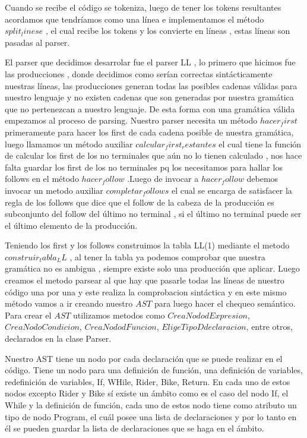 	Cuando se recibe el código se tokeniza, luego de tener los tokens resultantes acordamos que tendríamos como una línea e implementamos el método $split_linese$ , el cual	recibe los tokens y los convierte en líneas , estas líneas son pasadas al parser.
	
	El parser que decidimos desarrolar fue el parser LL , lo primero que hicimos fue las producciones , donde decidimos como serían correctas
	sintácticamente nuestras líneas, las producciones generan todas las posibles cadenas válidas para nuestro lenguaje y no existen cadenas
	que son generadas por nuestra gramática que no pertenezcan a nuestro lenguaje. De esta forma con una gramática válida empezamos al proceso
	de parsing. Nuestro parser necesita un método $hacer_first$ primeramente para hacer los first de cada cadena posible de nuestra gramática,
	luego llamamos un método auxiliar $calcular_first_restantes$ el cual tiene la función de calcular los first de los no terminales que aún
	no lo tienen calculado , nos hace falta guardar los first de los no terminales pq los necesitamos para hallar los follows en el método
	$hacer_follow$ .Luego de invocar a $hacer_follow$ debemos invocar un metodo auxiliar $completar_follows$ el cual se encarga de satisfacer
	la regla de los follows que dice que el follow de la cabeza de la producción es subconjunto del follow del último no terminal , si el último no terminal puede ser el último elemento de la producción.
	
	Teniendo los first y los follows construimos la tabla LL(1) mediante el metodo $construir_tabla_LL$ , al tener la tabla ya podemos comprobar que nuestra gramática no es ambigua , siempre existe solo una producción que aplicar. Luego creamos el metodo parsear al que hay que pasarle	todas las líneas de nuestro código una por una y este realiza la comprobacion sintáctica y en este mismo método vamos a ir creando nuestro	$AST$ para luego hacer el chequeo semántico. Para crear el $AST$ utilizamos metodos como $CreaNododExpresion$, $CreaNodoCondicion$, $CreaNododFuncion$, $EligeTipoDdeclaracion$, entre otros, declarados en la clase Parser. 
	
	Nuestro AST tiene un nodo por cada declaración que se puede realizar en el código. Tiene un nodo para una definición de función, una 
	definición de variables, redefinición de variables, If, WHile, Rider, Bike, Return. En cada uno de estos nodos excepto Rider y Bike sí existe un ámbito como es el caso del nodo If, el While y la definición de función, cada uno de estos nodo tiene como atributo un tipo de nodo Program, el cuál posee una lista de declaraciones y por lo tanto en él se pueden guardar la lista de declaraciones que se haga en el ámbito.
	
